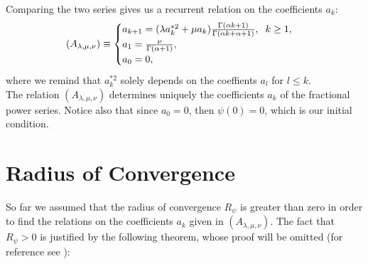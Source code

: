 \documentclass[a4paper,italian,11pt]{book}
\theoremstyle{plain}
\theoremstyle{remark}
\theoremstyle{plain}
\begin{document}
Comparing the two series gives us a recurrent relation on the coefficients $a_k$:
\begin{equation} 
    \label{eq: recurrent1}
    (A_{\lambda, \mu, \nu} ) \equiv
    \begin{cases}
    a_{k+1} = (\lambda a_k^{*2} + \mu a_k) \frac{\Gamma(\alpha k +1)}{\Gamma(\alpha k + \alpha  +1)}, \hspace{0.2cm} k\ge 1,
    \\
    a_1 = \frac{\nu}{\Gamma(\alpha+1)}, 
    \\
    a_0 = 0,
    \end{cases}
\end{equation}
where we remind that $a_k^{*2}$ solely depends on the coeffients $a_l$ for $l\le k$.
\\
The relation $(A_{\lambda, \mu, \nu} )$ determines uniquely the coefficients $a_k$ of the fractional power series. 
Notice also that since $a_0=0$, then $\psi(0)=0$, which is our initial condition.


\section{Radius of Convergence}

So far we assumed that the radius of convergence $R_\psi$ is greater than zero in order to find the relations on the coefficients $a_k$ given in $(A_{\lambda, \mu, \nu} )$. The fact that $R_\psi>0$ is justified by the following theorem, whose proof will be omitted (for reference see \cite{Main}):
\end{document}
